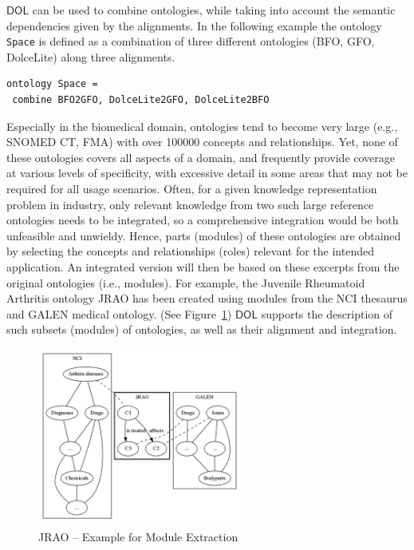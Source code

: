 \documentclass[10pt, a4paper]{isov2}
\newcommand*{\DOL}{\ensuremath{\mathsf{DOL}}\xspace}
\renewcommand{\figurerefname}{Figure}
\renewcommand{\fref}[1]{\figurerefname~\ref{#1}}
\begin{document}
 \DOL can be used to combine ontologies, while taking into account the semantic dependencies given by the alignments. In the following example the ontology \lstinline{Space} is defined as a combination of three different ontologies (BFO, GFO, DolceLite) along three alignments. 

\begin{lstlisting}[basicstyle=\ttfamily\footnotesize,language=dolText,escapechar=@,mathescape]
ontology Space =
 combine BFO2GFO, DolceLite2GFO, DolceLite2BFO
\end{lstlisting} 




\label{onto-3}
Especially in the biomedical domain, ontologies tend to become very large (e.g., SNOMED CT, FMA) 
with over 100000 concepts and relationships. Yet, none of these ontologies covers all aspects of a 
domain, and frequently provide coverage at various levels of specificity, with excessive detail in 
some areas that may not be required for all usage scenarios. Often, for a given knowledge 
representation problem in industry, only relevant knowledge from two such large reference 
ontologies needs to be integrated, so a comprehensive integration would be both unfeasible and 
unwieldy. Hence, parts (modules) of these ontologies are obtained by selecting the concepts and 
relationships (roles) relevant for the intended application. An integrated version will then be 
based on these excerpts from the original ontologies (i.e., modules). For example, the Juvenile 
Rheumatoid Arthritis ontology JRAO has been created using modules from the NCI thesaurus and GALEN 
medical ontology. (See \fref{JRAO}) \DOL  
supports the description of such subsets (modules) of ontologies, as well as their alignment and 
integration.


\begin{figure}[htbp]
\begin{center}
\includegraphics[width=0.6\textwidth]{useCaseOnto3.png}
\caption{JRAO  -- Example for Module Extraction}
\label{JRAO}
\end{center}
\end{figure}
\end{document}
